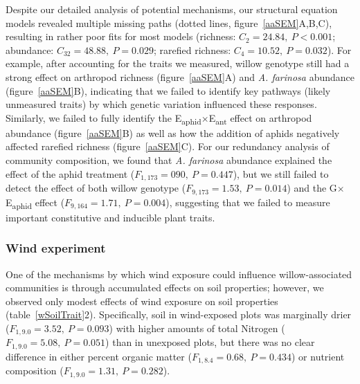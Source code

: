 \documentclass[11pt]{article}
\begin{document}
Despite our detailed analysis of potential mechanisms, our structural
equation models revealed multiple missing paths (dotted lines, figure~\ref{aaSEM}A,B,C), resulting in rather poor fits for most models (richness:
\(C_2=24.84,\ P<0.001\); abundance: \(C_{32}=48.88,\ P=0.029\); rarefied richness:
\(C_4=10.52,\ P=0.032\)). For example, after accounting for the traits we
measured, willow genotype still had a strong effect on arthropod
richness (figure~\ref{aaSEM}A) and \textit{A. farinosa} abundance (figure~\ref{aaSEM}B),
indicating that we failed to identify key pathways (likely unmeasured
traits) by which genetic variation influenced these responses.
Similarly, we failed to fully identify the E\textsubscript{aphid}$\times$E\textsubscript{ant} effect on
arthropod abundance (figure~\ref{aaSEM}B) as well as how the addition of aphids
negatively affected rarefied richness (figure~\ref{aaSEM}C). For our redundancy
analysis of community composition, we found that \textit{A. farinosa}
abundance explained the effect of the aphid treatment
(\(F_{1,173}=090,\ P=0.447\)), but we still failed to detect the effect of both
willow genotype ($F_{9,173}=1.53,\ P=0.014$) and the G$\times$E\textsubscript{aphid} effect
(\(F_{9,164}=1.71,\ P=0.004\)), suggesting that we failed to measure important
constitutive and inducible plant traits.

\subsubsection*{Wind experiment}

One of the mechanisms by which wind exposure could influence
willow-associated communities is through accumulated effects on soil
properties; however, we observed only modest effects of wind exposure on
soil properties (table~\ref{wSoilTrait}2). Specifically, soil in wind-exposed plots was
marginally drier (\(F_{1,9.0}=3.52,\ P=0.093\)) with higher amounts of total
Nitrogen (\(F_{1,9.0}=5.08,\ P=0.051\)) than in unexposed plots, but there was no
clear difference in either percent organic matter (\(F_{1,8.4}=0.68,\ P=0.434\)) or
nutrient composition (\(F_{1,9.0}=1.31,\ P=0.282\)).
\end{document}
